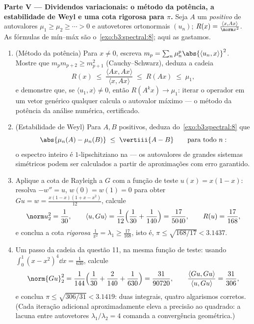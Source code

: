 \begin{problem}
\medskip
\noindent\textbf{Parte V --- Dividendos variacionais: o método da
potência, a estabilidade de Weyl e uma cota rigorosa para $\pi$.}
Seja $A$ um   \emph{positivo} de
autovalores $\mu_1 \geq \mu_2 \geq \cdots > 0$ e autovetores ortonormais $(u_n)$; $R(x) = \frac{\langle x,
Ax\rangle}{\norm x^2}$. As
fórmulas de mín--máx são o~\cref{exo:b3:spectral:8}; aqui as gastamos.
\begin{enumerate}[resume]
  \item (Método da potência) Para $x \neq 0$, escreva $m_p =
        \sum_n\mu_n^p\abs{\langle u_n, x\rangle}^2$. Mostre que $m_pm_{p+2} \geq m_{p+1}^2$
        (Cauchy--Schwarz), deduza a cadeia
        \[
        R(x) \;\leq\; \frac{\langle Ax, Ax\rangle}{\langle x,
        Ax\rangle} \;\leq\; R(Ax) \;\leq\; \mu_1,
        \]
        e demonstre que, se $\langle u_1, x\rangle \neq 0$, então $R(A^kx) \to \mu_1$: iterar o operador em um
        vetor genérico qualquer calcula o autovalor máximo --- o método
        da potência da análise numérica, certificado.
  \item (Estabilidade de Weyl) Para $A, B$  
        positivos, deduza do~\cref{exo:b3:spectral:8} que
        \[
        \abs{\mu_n(A) - \mu_n(B)} \;\leq\; \vertiii{A - B}
        \qquad\text{para todo } n :
        \]
        o espectro inteiro é $1$-lipschitziano na 
        --- os autovalores de grandes sistemas simétricos podem ser
        calculados a partir de aproximações com erro garantido.
  \item Aplique a cota de Rayleigh a $G$ com a função de teste
        $u(x) = x(1-x)$: resolva $-w'' = u$, $w(0) =
        w(1) = 0$ para obter $Gu = w = \frac{x(1-x)(1 + x -
        x^2)}{12}$, calcule
        \[
        \norm u_2^2 = \frac1{30}, \qquad
        \langle u, Gu\rangle = \frac1{12}\Bigl(\frac1{30} +
        \frac1{140}\Bigr) = \frac{17}{5040},
        \qquad R(u) = \frac{17}{168},
        \]
        e conclua a cota \emph{rigorosa} $\frac1{\pi^2}
        = \lambda_1 \geq \frac{17}{168}$, isto é, $\pi \leq
        \sqrt{168/17} < 3.1437$.
  \item Um passo da cadeia da questão 11, na mesma função de teste:
        usando $\int_0^1(x - x^2)^4\dd x =
        \frac1{630}$, calcule
        \[
        \norm{Gu}_2^2 = \frac1{144}\Bigl(\frac1{30} +
        \frac2{140} + \frac1{630}\Bigr) = \frac{31}{90720},
        \qquad
        \frac{\langle Gu, Gu\rangle}{\langle u, Gu\rangle} =
        \frac{31}{306},
        \]
        e conclua $\pi \leq \sqrt{306/31} < 3.1419$: duas integrais, quatro algarismos corretos.
        (Cada iteração adicional aproximadamente eleva a precisão ao
        quadrado: a lacuna entre autovetores $\lambda_1/\lambda_2 = 4$ comanda a
        convergência geométrica.)
\end{enumerate}


\end{problem}
